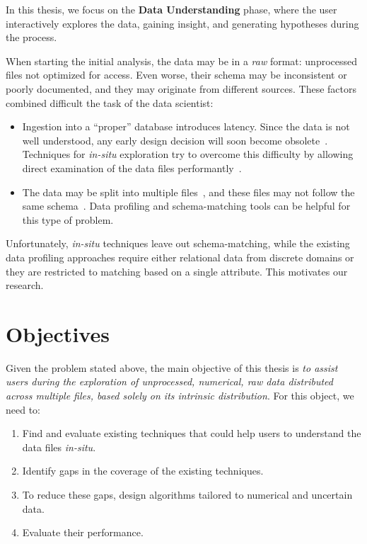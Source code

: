 In this thesis, we focus on the \textbf{Data Understanding} phase, where the user interactively
explores the data, gaining insight, and generating hypotheses during the process.

When starting the initial analysis, the data may be in a \emph{raw} format: unprocessed files not optimized for access. Even worse, their schema may be inconsistent or poorly documented, and they may originate from different sources. These factors combined difficult the task of the data scientist:

\begin{itemize}
    \item Ingestion into a ``proper'' database introduces latency. Since the data is not well
        understood, any early design decision will soon become obsolete~\cite{Kersten2011}.
        Techniques for \emph{in-situ} exploration try to overcome this difficulty
        by allowing direct examination of the data files performantly~\cite{Idreos2011}.
    \item The data may be split into multiple files~\cite{Baud2012}, and these files may not
        follow the same schema~\cite{Alawini2014}. Data profiling and schema-matching tools
        can be helpful for this type of problem.
\end{itemize}

Unfortunately, \emph{in-situ} techniques leave out schema-matching, while the existing
data profiling approaches require either relational data from discrete domains or they are restricted to matching based on a single attribute. This motivates our
research.

\section{Objectives}
\label{sec:main_objective}

Given the problem stated above, the main objective of this
thesis is \emph{to assist users during the exploration of unprocessed,
numerical, raw data distributed across multiple files,
based solely on its intrinsic distribution}. For this
object, we need to:

\begin{enumerate}
    \item Find and evaluate existing techniques that could help users to
    understand the data files \emph{in-situ}.
    \item Identify gaps in the coverage of the existing techniques.
    \item To reduce these gaps, design algorithms tailored to numerical and uncertain data.
    \item Evaluate their performance.
\end{enumerate}
\label{enum:objectives}

